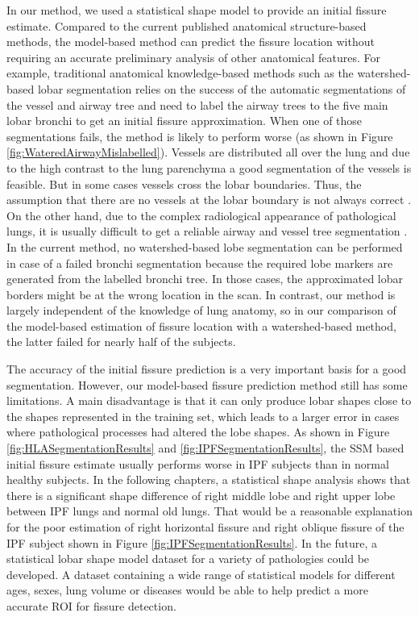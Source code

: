 {In our method, we used a statistical shape model to provide an initial fissure estimate. Compared to the current published anatomical structure-based methods, the model-based method can predict the fissure location without requiring an accurate preliminary analysis of other anatomical features. For example, traditional anatomical knowledge-based methods such as the watershed-based lobar segmentation relies on the success of the automatic segmentations of the vessel and airway tree and need to label the airway trees to the five main lobar bronchi to get an initial fissure approximation. When one of those segmentations fails, the method is likely to perform worse (as shown in Figure \ref{fig:WateredAirwayMislabelled}). Vessels are distributed all over the lung and due to the high contrast to the lung parenchyma a good segmentation of the vessels is feasible.  But in some cases vessels cross the lobar boundaries. Thus, the assumption that there are no vessels at the lobar boundary is not always correct \citep{pu2009pulmonary}. On the other hand, due to the complex radiological appearance of pathological lungs, it is usually difficult to get a reliable airway and vessel tree segmentation \citep{lassen2011interactive,lassen2013automatic}. In the current method, no watershed-based lobe segmentation can be performed in case of a failed bronchi segmentation because the required lobe markers are generated from the labelled bronchi tree. In those cases, the approximated lobar borders might be at the wrong location in the scan. In contrast, our method is largely independent of the knowledge of lung anatomy, so in our comparison of the model-based estimation of fissure location with a watershed-based method, the latter failed for nearly half of the subjects. 

The accuracy of the initial fissure prediction is a very important basis for a good segmentation. However, our model-based fissure prediction method still has some limitations.  A main disadvantage is that it can only produce lobar shapes close to the shapes represented in the training set, which leads to a larger error in cases where pathological processes had altered the lobe shapes. As shown in Figure \ref{fig:HLASegmentationResults} and \ref{fig:IPFSegmentationResults}, the SSM based initial fissure estimate usually performs worse in IPF subjects than in normal healthy subjects. In the following chapters, a statistical shape analysis shows that there is a significant shape difference of right middle lobe and right upper lobe between IPF lungs and normal old lungs. That would be a reasonable explanation for the poor estimation of right horizontal fissure and right oblique fissure of the IPF subject shown in Figure \ref{fig:IPFSegmentationResults}. In the future, a statistical lobar shape model dataset for a variety of pathologies could be developed. A dataset containing a wide range of statistical models for different ages, sexes, lung volume or diseases would be able to help predict a more accurate ROI for fissure detection.

}
